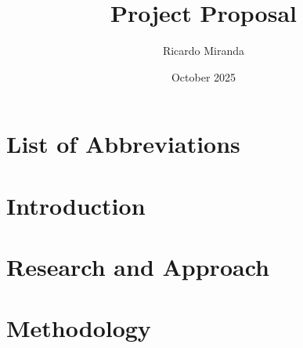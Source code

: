 \documentclass[12pt, letterpaper]{report}
\title{Project Proposal}
\author{Ricardo Miranda}
\date{October 2025}
\begin{document}



% 

% 

\tableofcontents
\thispagestyle{empty}
\addtocounter{page}{-1}
\newpage



\chapter*{List of Abbreviations}
{}
\label{abbreviation}

\newpage


\chapter{Introduction}
\label{introduction}


\chapter{Research and Approach}
\label{researchapproach}


\chapter{Methodology}
\label{reqstimeline}


% 
\end{document}
